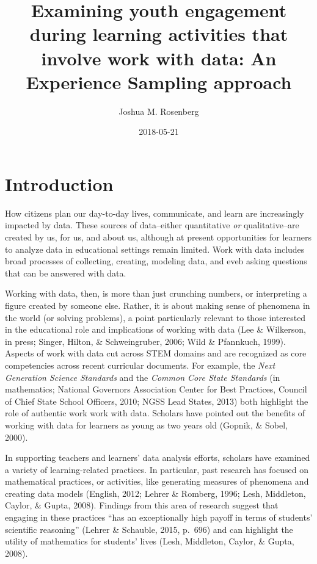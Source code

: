 \documentclass[]{book}
\title{Examining youth engagement during learning activities that involve work
with data: An Experience Sampling approach}
\author{Joshua M. Rosenberg}
\date{2018-05-21}
\theoremstyle{definition}
\theoremstyle{definition}
\theoremstyle{definition}
\theoremstyle{remark}
\begin{document}
\maketitle

{
\setcounter{tocdepth}{1}
\tableofcontents
}
\chapter{Introduction}\label{intro-placemarker}

How citizens plan our day-to-day lives, communicate, and learn are
increasingly impacted by data. These sources of data--either
quantitative \emph{or} qualitative--are created by us, for us, and about
us, although at present opportunities for learners to analyze data in
educational settings remain limited. Work with data includes broad
processes of collecting, creating, modeling data, and eveb asking
questions that can be answered with data.

Working with data, then, is more than just crunching numbers, or
interpreting a figure created by someone else. Rather, it is about
making sense of phenomena in the world (or solving problems), a point
particularly relevant to those interested in the educational role and
implications of working with data (Lee \& Wilkerson, in press; Singer,
Hilton, \& Schweingruber, 2006; Wild \& Pfannkuch, 1999). Aspects of
work with data cut across STEM domains and are recognized as core
competencies across recent curricular documents. For example, the
\emph{Next Generation Science Standards} and the \emph{Common Core State
Standards} (in mathematics; National Governors Association Center for
Best Practices, Council of Chief State School Officers, 2010; NGSS Lead
States, 2013) both highlight the role of authentic work work with data.
Scholars have pointed out the benefits of working with data for learners
as young as two years old (Gopnik, \& Sobel, 2000).

In supporting teachers and learners' data analysis efforts, scholars
have examined a variety of learning-related practices. In particular,
past research has focused on mathematical practices, or activities, like
generating measures of phenomena and creating data models (English,
2012; Lehrer \& Romberg, 1996; Lesh, Middleton, Caylor, \& Gupta, 2008).
Findings from this area of research suggest that engaging in these
practices ``has an exceptionally high payoff in terms of students'
scientific reasoning'' (Lehrer \& Schauble, 2015, p.~696) and can
highlight the utility of mathematics for students' lives (Lesh,
Middleton, Caylor, \& Gupta, 2008).
\end{document}
